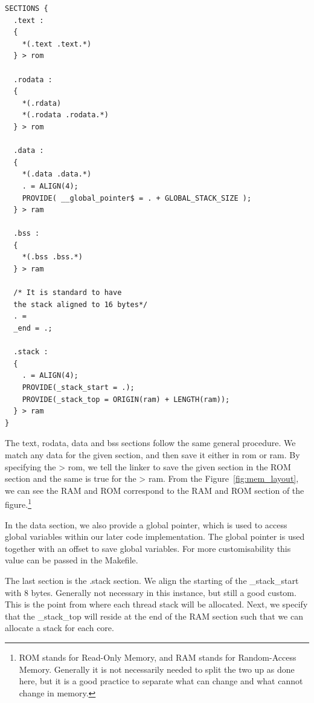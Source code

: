 \begin{lstlisting}[caption=Linker scripts SECTIONS.]
SECTIONS {
  .text :
  {
    *(.text .text.*)
  } > rom

  .rodata :
  {
    *(.rdata)
    *(.rodata .rodata.*)
  } > rom

  .data :
  {
    *(.data .data.*)
    . = ALIGN(4);
    PROVIDE( __global_pointer$ = . + GLOBAL_STACK_SIZE );
  } > ram

  .bss :
  {
    *(.bss .bss.*)
  } > ram

  /* It is standard to have
  the stack aligned to 16 bytes*/
  . =
  _end = .;

  .stack :
  {
    . = ALIGN(4);
    PROVIDE(_stack_start = .);
    PROVIDE(_stack_top = ORIGIN(ram) + LENGTH(ram));
  } > ram
}
\end{lstlisting}
The text, rodata, data and bss sections follow the same general procedure. We
match any data for the given section, and then save it either in rom or ram. By
specifying the > rom, we tell the linker to save the given section in the ROM
section and the same is true for the > ram. From the
Figure~\ref{fig:mem_layout}, we can see the RAM and ROM correspond to the RAM
and ROM section of the figure.\footnote{ROM stands for Read-Only Memory, and RAM
  stands for Random-Access Memory. Generally it is not necessarily needed to
split the two up as done here, but it is a good practice to separate what can
change and what cannot change in memory.}

In the data section, we also provide a global pointer, which is used to access
global variables within our later code implementation. The global pointer is
used together with an offset to save global variables. For more customisability
this value can be passed in the Makefile.

The last section is the .stack section. We align the starting of the
\_stack\_start with 8 bytes. Generally not necessary in this instance, but still
a good custom. This is the point from where each thread stack will be allocated.
Next, we specify that the \_stack\_top will reside at the end of the RAM section
such that we can allocate a stack for each core.

